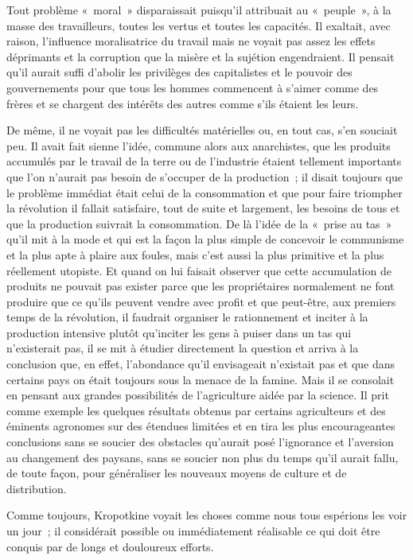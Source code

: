 \documentclass[french,twoside]{book} %
\begin{document}
Tout problème « moral » disparaissait puisqu’il attribuait au « peuple », à la masse des travailleurs, toutes les vertus et toutes les capacités. Il exaltait, avec raison, l’influence moralisatrice du travail mais ne voyait pas assez les effets déprimants et la corruption que la misère et la sujétion engendraient. Il pensait qu’il aurait suffi d’abolir les privilèges des capitalistes et le pouvoir des gouvernements pour que tous les hommes commencent à s’aimer comme des frères et se chargent des intérêts des autres comme s’ils étaient les leurs.\par
De même, il ne voyait pas les difficultés matérielles ou, en tout cas, s’en souciait peu. Il avait fait sienne l’idée, commune alors aux anarchistes, que les produits accumulés par le travail de la terre ou de l’industrie étaient tellement importants que l’on n’aurait pas besoin de s’occuper de la production ; il disait toujours que le problème immédiat était celui de la consommation et que pour faire triompher la révolution il fallait satisfaire, tout de suite et largement, les besoins de tous et que la production suivrait la consommation. De là l’idée de la « prise au tas » qu’il mit à la mode et qui est la façon la plus simple de concevoir le communisme et la plus apte à plaire aux foules, mais c’est aussi la plus primitive et la plus réellement utopiste. Et quand on lui faisait observer que cette accumulation de produits ne pouvait pas exister parce que les propriétaires normalement ne font produire que ce qu’ils peuvent vendre avec profit et que peut-être, aux premiers temps de la révolution, il faudrait organiser le rationnement et inciter à la production intensive plutôt qu’inciter les gens à puiser dans un tas qui n’existerait pas, il se mit à étudier directement la question et arriva à la conclusion que, en effet, l’abondance qu’il envisageait n’existait pas et que dans certains pays on était toujours sous la menace de la famine. Mais il se consolait en pensant aux grandes possibilités de l’agriculture aidée par la science. Il prit comme exemple les quelques résultats obtenus par certains agriculteurs et des éminents agronomes sur des étendues limitées et en tira les plus encourageantes conclusions sans se soucier des obstacles qu’aurait posé l’ignorance et l’aversion au changement des paysans, sans se soucier non plus du temps qu’il aurait fallu, de toute façon, pour généraliser les nouveaux moyens de culture et de distribution.\par
Comme toujours, Kropotkine voyait les choses comme nous tous espérions les voir un jour ; il considérait possible ou immédiatement réalisable ce qui doit être conquis par de longs et douloureux efforts.\par
\end{document}
